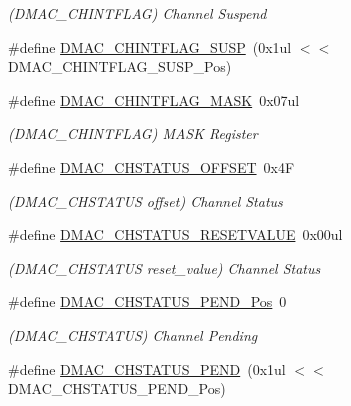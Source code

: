 \begin{DoxyCompactItemize}
\begin{DoxyCompactList}\small\item\em (D\+M\+A\+C\+\_\+\+C\+H\+I\+N\+T\+F\+L\+AG) Channel Suspend \end{DoxyCompactList}\item 
\#define \mbox{\hyperlink{group___s_a_m_d21___d_m_a_c_ga69acb0cd63ab94f4ec4d997252643a6c}{D\+M\+A\+C\+\_\+\+C\+H\+I\+N\+T\+F\+L\+A\+G\+\_\+\+S\+U\+SP}}~(0x1ul $<$$<$ D\+M\+A\+C\+\_\+\+C\+H\+I\+N\+T\+F\+L\+A\+G\+\_\+\+S\+U\+S\+P\+\_\+\+Pos)
\item 
\#define \mbox{\hyperlink{group___s_a_m_d21___d_m_a_c_ga3e4ed8ac63e8c507d988be35b86628fc}{D\+M\+A\+C\+\_\+\+C\+H\+I\+N\+T\+F\+L\+A\+G\+\_\+\+M\+A\+SK}}~0x07ul
\begin{DoxyCompactList}\small\item\em (D\+M\+A\+C\+\_\+\+C\+H\+I\+N\+T\+F\+L\+AG) M\+A\+SK Register \end{DoxyCompactList}\item 
\#define \mbox{\hyperlink{group___s_a_m_d21___d_m_a_c_gabe54ae70458b70c71055302e6ade7254}{D\+M\+A\+C\+\_\+\+C\+H\+S\+T\+A\+T\+U\+S\+\_\+\+O\+F\+F\+S\+ET}}~0x4F
\begin{DoxyCompactList}\small\item\em (D\+M\+A\+C\+\_\+\+C\+H\+S\+T\+A\+T\+US offset) Channel Status \end{DoxyCompactList}\item 
\#define \mbox{\hyperlink{group___s_a_m_d21___d_m_a_c_ga5a6f9ee2bfaa056b04257dd388cdf25a}{D\+M\+A\+C\+\_\+\+C\+H\+S\+T\+A\+T\+U\+S\+\_\+\+R\+E\+S\+E\+T\+V\+A\+L\+UE}}~0x00ul
\begin{DoxyCompactList}\small\item\em (D\+M\+A\+C\+\_\+\+C\+H\+S\+T\+A\+T\+US reset\+\_\+value) Channel Status \end{DoxyCompactList}\item 
\#define \mbox{\hyperlink{group___s_a_m_d21___d_m_a_c_ga75fed352937bb04158598ff9a898eb27}{D\+M\+A\+C\+\_\+\+C\+H\+S\+T\+A\+T\+U\+S\+\_\+\+P\+E\+N\+D\+\_\+\+Pos}}~0
\begin{DoxyCompactList}\small\item\em (D\+M\+A\+C\+\_\+\+C\+H\+S\+T\+A\+T\+US) Channel Pending \end{DoxyCompactList}\item 
\#define \mbox{\hyperlink{group___s_a_m_d21___d_m_a_c_ga988654c61c91e40a430b69f52fb21348}{D\+M\+A\+C\+\_\+\+C\+H\+S\+T\+A\+T\+U\+S\+\_\+\+P\+E\+ND}}~(0x1ul $<$$<$ D\+M\+A\+C\+\_\+\+C\+H\+S\+T\+A\+T\+U\+S\+\_\+\+P\+E\+N\+D\+\_\+\+Pos)

\end{DoxyCompactItemize}
